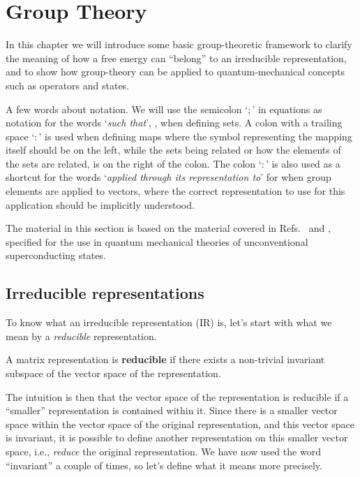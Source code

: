 \chapter{Group Theory}
\label{chap:Group}
%
\noindent In this chapter we will introduce some basic group-theoretic framework to clarify the meaning of how a free energy can
``belong'' to an irreducible representation, and to show how group-theory can be applied to quantum-mechanical concepts such as
operators and states.

A few words about notation. We will use the semicolon `$;$' in equations as notation for the words `\emph{such that}', \eg, when defining sets.
A colon with a trailing space `$\colon$' is used when defining maps where the symbol representing the mapping itself should be on the left, while the sets
being related or how the elements of the sets are related, is on the right of the colon. The colon `$:$' is also used as a shortcut for the
words `\emph{applied through its representation to}' for when group elements are applied to vectors, where the correct representation to use
for this application should be implicitly understood.

The material in this section is based on the material covered in Refs.~\cite{Inui90} and \cite{NegeleOrland98}, specified for the use in
quantum mechanical theories of unconventional superconducting states.

\section{Irreducible representations}

To know what an irreducible representation (IR) is, let's start with what we mean by a \emph{reducible} representation.
\begin{defi}
    A matrix representation is \textbf{reducible} if there exists a non-trivial invariant subspace of the vector space of the representation.
\end{defi}
The intuition is then that the vector space of the representation is reducible if a ``smaller'' representation is contained within it. Since
there is a smaller vector space within the vector space of the original representation, and this vector space is invariant, it is possible
to define another representation on this smaller vector space, i.e., \emph{reduce} the original representation. We have now used the word
``invariant'' a couple of times, so let's define what it means more precisely.

